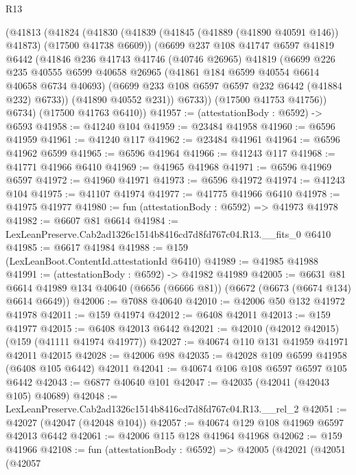 \begin{lexlean}{R13}
\begin{coremodule}
      (@41813
        (@41824
          (@41830
            (@41839 (@41845 (@41889 (@41890 @40591 @146)) @41873) (@17500 @41738 @6609))
            (@6699
              @237
              @108
              @41747
              @6597
              @41819
              @6442
              (@41846
                @236
                @41743
                @41746
                (@40746 @26965)
                @41819
                (@6699
                  @226
                  @235
                  @40555
                  @6599
                  @40658
                  @26965
                  (@41861 @184 @6599 @40554 @6614 @40658 @6734 @40693)
                  (@6699 @233 @108 @6597 @6597 @232 @6442 (@41884 @232) @6733))
                (@41890 @40552 @231))
              @6733))
          (@17500 @41753 @41756))
        @6734)
      (@17500 @41763 @6410))
@41957 := (attestationBody : @6592) -> @6593
@41958 := @41240 @104
@41959 := @23484 @41958
@41960 := @6596 @41959
@41961 := @41240 @117
@41962 := @23484 @41961
@41964 := @6596 @41962 @6599
@41965 := @6596 @41964
@41966 := @41243 @117
@41968 := @41771 @41966 @6410
@41969 := @41965 @41968
@41971 := @6596 @41969 @6597
@41972 := @41960 @41971
@41973 := @6596 @41972
@41974 := @41243 @104
@41975 := @41107 @41974
@41977 := @41775 @41966 @6410
@41978 := @41975 @41977
@41980 := fun (attestationBody : @6592) => @41973 @41978
@41982 := @6607 @81 @6614
@41984 := LexLeanPreserve.Cab2ad1326c1514b8416cd7d8fd767c04.R13.__fits_0 @6410
@41985 := @6617 @41984
@41988 := @159 (LexLeanBoot.ContentId.attestationId @6410)
@41989 := @41985 @41988
@41991 := (attestationBody : @6592) -> @41982 @41989
@42005 := @6631
    @81
    @6614
    @41989
    @134
    @40640
    (@6656 (@6666 @81))
    (@6672 (@6673 (@6674 @134) @6614 @6649))
@42006 := @7088 @40640
@42010 := @42006 @50 @132 @41972 @41978
@42011 := @159 @41974
@42012 := @6408 @42011
@42013 := @159 @41977
@42015 := @6408 @42013 @6442
@42021 := @42010 (@42012 @42015) (@159 (@41111 @41974 @41977))
@42027 := @40674 @110 @131 @41959 @41971 @42011 @42015
@42028 := @42006 @98
@42035 := @42028 @109 @6599 @41958 (@6408 @105 @6442) @42011
@42041 := @40674 @106 @108 @6597 @6597 @105 @6442
@42043 := @6877 @40640 @101
@42047 := @42035 (@42041 (@42043 @105) @40689)
@42048 := LexLeanPreserve.Cab2ad1326c1514b8416cd7d8fd767c04.R13.__rel_2
@42051 := @42027 (@42047 (@42048 @104))
@42057 := @40674 @129 @108 @41969 @6597 @42013 @6442
@42061 := @42006 @115 @128 @41964 @41968
@42062 := @159 @41966
@42108 := fun (attestationBody : @6592) =>
  @42005
    (@42021
      (@42051
        (@42057

\end{coremodule}
\end{lexlean}
